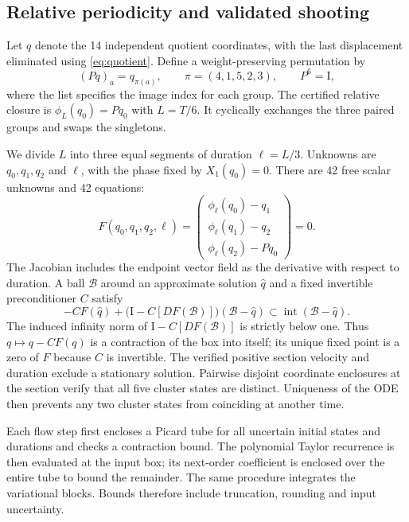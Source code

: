 \documentclass[11pt]{article}
\newcommand{\Id}{\mathrm{I}}
\begin{document}
\subsection{Relative periodicity and validated shooting}
Let $q$ denote the 14 independent quotient coordinates, with the last
displacement eliminated using \eqref{eq:quotient}. Define a weight-preserving
permutation by
\begin{equation}
 (Pq)_a=q_{\pi(a)},\qquad \pi=(4,1,5,2,3),\qquad P^6=\Id,
 \label{eq:permutation}
\end{equation}
where the list specifies the image index for each group. The certified
relative closure is $\phi_L(q_0)=Pq_0$ with $L=T/6$.
It cyclically exchanges the three paired groups and swaps the singletons.

We divide $L$ into three equal segments of duration $\ell=L/3$. Unknowns
are $q_0,q_1,q_2$ and $\ell$, with the phase fixed by $X_1(q_0)=0$.
There are 42 free scalar unknowns and 42 equations:
\begin{equation}
 F(q_0,q_1,q_2,\ell)=
 \begin{pmatrix}
 \phi_\ell(q_0)-q_1\\
 \phi_\ell(q_1)-q_2\\
 \phi_\ell(q_2)-Pq_0
 \end{pmatrix}=0.\label{eq:shoot}
\end{equation}
The Jacobian includes the endpoint vector field as the derivative with
respect to duration. A ball $\mathcal B$ around an approximate solution
$\hat q$ and a fixed invertible preconditioner $C$ satisfy
\begin{equation}
 -CF(\hat q)+\bigl(\Id-C[DF(\mathcal B)]\bigr)
       (\mathcal B-\hat q)
       \subset\operatorname{int}(\mathcal B-\hat q).\label{eq:kraw}
\end{equation}
The induced infinity norm of $\Id-C[DF(\mathcal B)]$ is strictly below
one. Thus $q\mapsto q-CF(q)$ is a contraction of the box into itself;
its unique fixed point is a zero of $F$ because $C$ is invertible.
The verified positive section velocity and duration exclude a stationary
solution. Pairwise disjoint coordinate enclosures at the section verify
that all five cluster states are distinct. Uniqueness of the ODE then
prevents any two cluster states from coinciding at another time.

Each flow step first encloses a Picard tube for all uncertain initial
states and durations and checks a contraction bound. The polynomial
Taylor recurrence is then evaluated at the input box; its next-order
coefficient is enclosed over the entire tube to bound the remainder.
The same procedure integrates the variational blocks. Bounds therefore
include truncation, rounding and input uncertainty.
\end{document}
